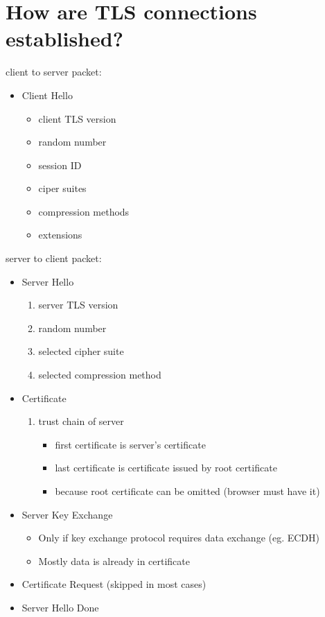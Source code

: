 \documentclass[twocolumn]{article}
\newcommand{\question}[1]{\section{#1}}
\begin{document}
\question{How are TLS connections established?}
%
client to server packet:
%
\begin{itemize}
  \item Client Hello
    \begin{itemize}
      \item client TLS version
      \item random number
      \item session ID
      \item ciper suites
      \item compression methods
      \item extensions
    \end{itemize}
\end{itemize}
%
server to client packet:
%
\begin{itemize}
  \item Server Hello
    \begin{enumerate}
      \item server TLS version
      \item random number
      \item selected cipher suite
      \item selected compression method
    \end{enumerate}
  \item Certificate
    \begin{enumerate}
      \item trust chain of server
        \begin{itemize}
          \item first certificate is server's certificate
          \item last certificate is certificate issued by root certificate
          \item because root certificate can be omitted (browser must have it)
        \end{itemize}
    \end{enumerate}
  \item Server Key Exchange
    \begin{itemize}
      \item Only if key exchange protocol requires data exchange (eg. ECDH)
      \item Mostly data is already in certificate
    \end{itemize}
  \item Certificate Request (skipped in most cases)
  \item Server Hello Done
\end{itemize}
\end{document}
